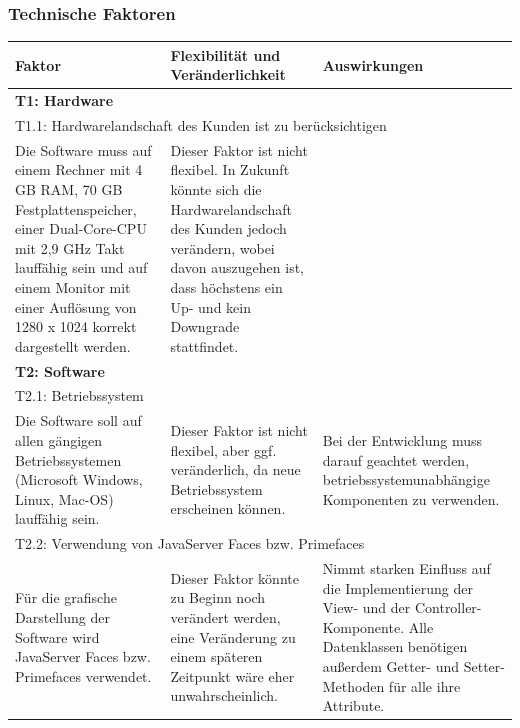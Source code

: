 \documentclass[fontsize=12pt,paper=a4,twoside]{scrartcl}
\begin{document}
\subsubsection{Technische Faktoren}

\begin{tabularx}{\textwidth}{|X|X|X|}
\hline
\textbf{Faktor} & \textbf{Flexibilität und Veränderlichkeit} & \textbf{Auswirkungen}\\\hline
\hline
\multicolumn{3}{|l|}{\textbf{T1: Hardware}}\\\hline
\multicolumn{3}{|l|}{T1.1: Hardwarelandschaft des Kunden ist zu berücksichtigen}\\\hline
Die Software muss auf einem Rechner mit 4 GB RAM, 70 GB Festplattenspeicher, einer Dual-Core-CPU mit 2,9 GHz Takt lauffähig sein und auf einem Monitor mit einer Auflösung von 1280 x 1024 korrekt dargestellt werden. & Dieser Faktor ist nicht flexibel. In Zukunft könnte sich die Hardwarelandschaft des Kunden jedoch verändern, wobei davon auszugehen ist, dass höchstens ein Up- und kein Downgrade stattfindet. & %
 \\\hline

\multicolumn{3}{|l|}{\textbf{T2: Software}}\\\hline
\multicolumn{3}{|l|}{T2.1: Betriebssystem}\\\hline
Die Software soll auf allen gängigen Betriebssystemen (Microsoft Windows, Linux, Mac-OS) lauffähig sein. & Dieser Faktor ist nicht flexibel, aber ggf. veränderlich, da neue Betriebssystem erscheinen können. & Bei der Entwicklung muss darauf geachtet werden, betriebssystemunabhängige Komponenten zu verwenden.\\\hline
\multicolumn{3}{|l|}{T2.2: Verwendung von JavaServer Faces bzw. Primefaces}\\\hline
Für die grafische Darstellung der Software wird JavaServer Faces bzw. Primefaces verwendet. & Dieser Faktor könnte zu Beginn noch verändert werden, eine Veränderung zu einem späteren Zeitpunkt wäre eher unwahrscheinlich. & Nimmt starken Einfluss auf die Implementierung der View- und der Controller-Komponente. Alle Datenklassen benötigen außerdem Getter- und Setter-Methoden für alle ihre Attribute. \\\hline
\end{tabularx} \clearpage
\end{document}
